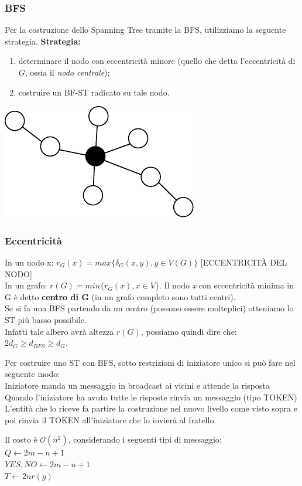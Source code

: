 \subsubsection{BFS}
Per la costruzione dello Spanning Tree tramite la BFS, utilizziamo la seguente
strategia.
\textbf{Strategia:}
\begin{enumerate}
    \item determinare il nodo con eccentricità minore (quello che detta
          l'eccentricità di $G$, ossia il \textit{nodo centrale});
    \item costruire un BF-ST radicato su tale nodo.
\end{enumerate}

\begin{center}
    \includegraphics[scale=1]{images/n_24}
\end{center}

\subsubsection{Eccentricità}
In un nodo x: $r_G(x) = max\{ \delta_G(x,y), y \in V(G) \}$ [ECCENTRICITÀ
        DEL NODO]\\
In un grafo: $r(G) = min \{ r_G(x), x \in V \}$. Il nodo \emph{x} con
eccentricità minima in G è detto \textbf{centro di G} (in un grafo completo sono
tutti centri).\\

Se si fa una BFS partendo da un centro (possono essere molteplici) otteniamo lo
ST più basso possibile.\\
Infatti tale albero avrà altezza $r(G)$, possiamo quindi dire che: $2 d_G \geq
    d_{BFS} \geq d_G$.

Per costruire uno ST con BFS, sotto restrizioni di iniziatore unico si può fare
nel seguente modo:\\
Iniziatore manda un messaggio in broadcast ai vicini e attende la risposta\\
Quando l'iniziatore ha avuto tutte le risposte rinvia un messaggio (tipo
TOKEN)\\
L'entità che lo riceve fa partire la costruzione nel nuovo livello come visto
sopra e poi rinvia il TOKEN all'iniziatore che lo invierà al fratello.

Il costo è $\mathcal{O}(n^2)$, considerando i seguenti tipi di messaggio:\\
$Q \leftarrow 2m - n +1$\\
$YES, NO \leftarrow 2m -n +1$\\
$T \leftarrow 2n r(g)$
